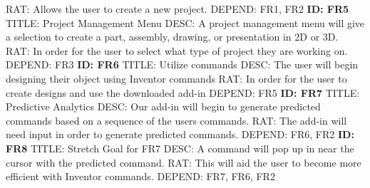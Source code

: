 \documentclass[onecolumn, draftclsnofoot,10pt, compsoc]{IEEEtran}
\begin{document}
RAT: Allows the user to create a new project.\newline
DEPEND: FR1, FR2\newline
\newline
\textbf{ID: FR5}\newline
TITLE: Project Management Menu \newline
DESC: A project management menu will give a selection to create a part, assembly, drawing, or presentation in 2D or 3D. \newline
RAT: In order for the user to select what type of project they are working on.\newline
DEPEND: FR3\newline
\newline
\textbf{ID: FR6}\newline
TITLE: Utilize commands\newline
DESC: The user will begin designing their object using Inventor commands\newline
RAT: In order for the user to create designs and use the downloaded add-in\newline
DEPEND: FR5\newline
\newline
\textbf{ID: FR7}\newline
TITLE: Predictive Analytics\newline
DESC: Our add-in will begin to generate predicted commands based on a sequence of the users commands. \newline
RAT: The add-in will need input in order to generate predicted commands.\newline
DEPEND: FR6, FR2\newline
\newline
\textbf{ID: FR8}\newline
TITLE: Stretch Goal for FR7\newline
DESC: A command will pop up in near the cursor with the predicted command.\newline
RAT: This will aid the user to become more efficient with Inventor commands.\newline
DEPEND: FR7, FR6, FR2\newline
\newline
\end{document}
